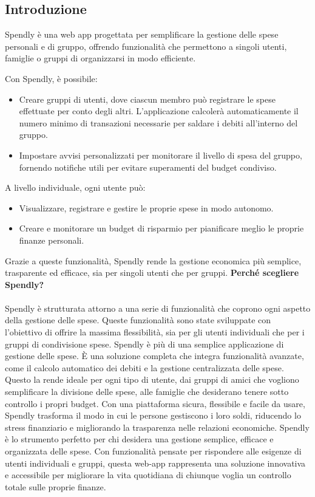 \subsection{Introduzione}

Spendly è una web app progettata per semplificare la gestione delle spese personali e di gruppo, offrendo funzionalità che permettono a singoli utenti, famiglie o gruppi di organizzarsi in modo efficiente.

Con Spendly, è possibile:
\begin{itemize}
    \item Creare gruppi di utenti, dove ciascun membro può registrare le spese effettuate per conto degli altri. L'applicazione calcolerà automaticamente il numero minimo di transazioni necessarie per saldare i debiti all'interno del gruppo.
    \item Impostare avvisi personalizzati per monitorare il livello di spesa del gruppo, fornendo notifiche utili per evitare superamenti del budget condiviso.
\end{itemize}

A livello individuale, ogni utente può:
\begin{itemize}
    \item Visualizzare, registrare e gestire le proprie spese in modo autonomo.
    \item Creare e monitorare un budget di risparmio per pianificare meglio le proprie finanze personali.
\end{itemize}
Grazie a queste funzionalità, Spendly rende la gestione economica più semplice, trasparente ed efficace, sia per singoli utenti che per gruppi.
\newline
\newline
\textbf{Perché scegliere Spendly?}
\\
\\
Spendly è strutturata attorno a una serie di funzionalità che coprono ogni aspetto della gestione delle spese. Queste funzionalità sono state sviluppate con l'obiettivo di offrire la massima flessibilità, sia per gli utenti individuali che per i gruppi di condivisione spese.
Spendly è più di una semplice applicazione di gestione delle spese. È una soluzione completa che integra funzionalità avanzate, come il calcolo automatico dei debiti e la gestione centralizzata delle spese. Questo la rende ideale per ogni tipo di utente, dai gruppi di amici che vogliono semplificare la divisione delle spese, alle famiglie che desiderano tenere sotto controllo i propri budget.
Con una piattaforma sicura, flessibile e facile da usare, Spendly trasforma il modo in cui le persone gestiscono i loro soldi, riducendo lo stress finanziario e migliorando la trasparenza nelle relazioni economiche.
Spendly è lo strumento perfetto per chi desidera una gestione semplice, efficace e organizzata delle spese. Con funzionalità pensate per rispondere alle esigenze di utenti individuali e gruppi, questa web-app rappresenta una soluzione innovativa e accessibile per migliorare la vita quotidiana di chiunque voglia un controllo totale sulle proprie finanze.